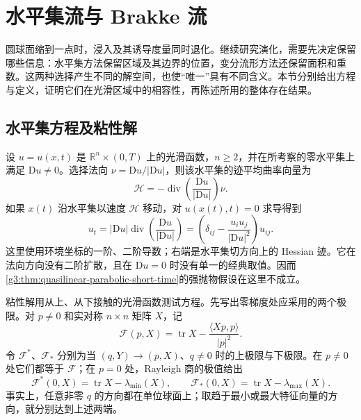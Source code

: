 
% 
% 
% 

\section{水平集流与 Brakke 流}
\label{g3:sec:2804}

圆球面缩到一点时，浸入及其诱导度量同时退化。继续研究演化，需要先决定保留哪些信息：水平集方法保留区域及其边界的位置，变分流形方法还保留面积和重数。这两种选择产生不同的解空间，也使“唯一”具有不同含义。本节分别给出方程与定义，证明它们在光滑区域中的相容性，再陈述所用的整体存在结果。

\subsection{水平集方程及粘性解}
\label{g3:subsec:2804:01}
设 \(u=u(x,t)\) 是 \(\mathbb R^n\times(0,T)\) 上的光滑函数，\(n\ge2\)，并在所考察的零水平集上满足 \(\mathrm Du\ne0\)。选择法向 \(\nu=\mathrm Du/|\mathrm Du|\)，则该水平集的迹平均曲率向量为
\[
\mathcal H=-\operatorname{div}\left(\frac{\mathrm Du}{|\mathrm Du|}\right)\nu.
\]
如果 \(x(t)\) 沿水平集以速度 \(\mathcal H\) 移动，对 \(u(x(t),t)=0\) 求导得到
\begin{equation}\label{g3:eq:mcf-level-set}
	u_t=|\mathrm Du|\operatorname{div}\left(\frac{\mathrm Du}{|\mathrm Du|}\right)
	=\left(\delta_{ij}-\frac{u_i u_j}{|\mathrm Du|^2}\right)u_{ij}.
\end{equation}
这里使用环境坐标的一阶、二阶导数；右端是水平集切方向上的 Hessian 迹。它在法向方向没有二阶扩散，且在 \(\mathrm Du=0\) 时没有单一的经典取值。因而\cref{g3:thm:quasilinear-parabolic-short-time}的强抛物假设在这里不成立。

\ProseParagraphBreak
粘性解用从上、从下接触的光滑函数测试方程。先写出零梯度处应采用的两个极限。对 \(p\ne0\) 和实对称 \(n\times n\) 矩阵 \(X\)，记
\[
\mathcal F(p,X)=\operatorname{tr}X-\frac{\langle Xp,p\rangle}{|p|^2}.
\]
令 \(\mathcal F^*\)、\(\mathcal F_*\) 分别为当 \((q,Y)\to(p,X)\)、\(q\ne0\) 时的上极限与下极限。在 \(p\ne0\) 处它们都等于 \(\mathcal F\)；在 \(p=0\) 处，Rayleigh 商的极值给出
\begin{equation}\label{g3:eq:mcf-level-set-envelopes}
	\mathcal F^*(0,X)=\operatorname{tr}X-\lambda_{\min}(X),
	\qquad
	\mathcal F_*(0,X)=\operatorname{tr}X-\lambda_{\max}(X).
\end{equation}
事实上，任意非零 \(q\) 的方向都在单位球面上；取趋于最小或最大特征向量的方向，就分别达到上述两端。

